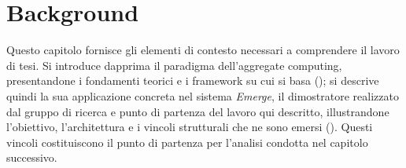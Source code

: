 \chapter{Background}
\label{chap:background}
%
Questo capitolo fornisce gli elementi di contesto necessari a comprendere il lavoro di tesi. Si introduce dapprima il paradigma dell'aggregate computing, presentandone i fondamenti teorici e i framework su cui si basa (); si descrive quindi la sua applicazione concreta nel sistema \textit{Emerge}, il dimostratore realizzato dal gruppo di ricerca e punto di partenza del lavoro qui descritto, illustrandone l'obiettivo, l'architettura e i vincoli strutturali che ne sono emersi (). Questi vincoli costituiscono il punto di partenza per l'analisi condotta nel capitolo successivo.
%
 
%

%
